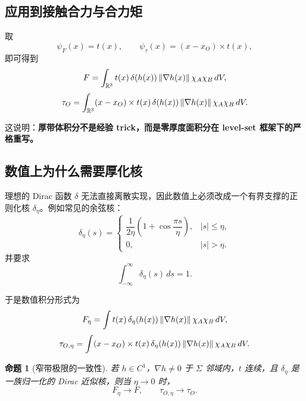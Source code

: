 \documentclass[12pt,a4paper]{ctexart}
\newtheorem{proposition}{命题}
\begin{document}
\subsection{应用到接触合力与合力矩}
取
\begin{equation}
    \psi_F(x)=t(x),
    \qquad
    \psi_\tau(x)=(x-x_O)\times t(x),
\end{equation}
即可得到
\begin{equation}
    F = \int_{\mathbb R^3} t(x)\,\delta(h(x))\,\norm{\nabla h(x)}\,\chi_A\chi_B\,dV,
\end{equation}
\begin{equation}
    \tau_O = \int_{\mathbb R^3}(x-x_O)\times t(x)\,\delta(h(x))\,\norm{\nabla h(x)}\,\chi_A\chi_B\,dV.
\end{equation}

这说明：\textbf{厚带体积分不是经验 trick，而是零厚度面积分在 level-set 框架下的严格重写。}

\subsection{数值上为什么需要厚化核}
理想的 Dirac 函数 $\delta$ 无法直接离散实现，因此数值上必须改成一个有界支撑的正则化核 $\delta_\eta$。例如常见的余弦核：
\begin{equation}
    \delta_\eta(s)=
    \begin{cases}
        \dfrac{1}{2\eta}\left(1+\cos\dfrac{\pi s}{\eta}\right), & |s|\le \eta,\\[2mm]
        0, & |s|>\eta.
    \end{cases}
\end{equation}
并要求
\begin{equation}
    \int_{-\infty}^{\infty}\delta_\eta(s)\,ds = 1.
\end{equation}

于是数值积分形式为
\begin{equation}
    F_\eta = \int t(x)\,\delta_\eta(h(x))\,\norm{\nabla h(x)}\,\chi_A\chi_B\,dV,
\end{equation}
\begin{equation}
    \tau_{O,\eta} = \int (x-x_O)\times t(x)\,\delta_\eta(h(x))\,\norm{\nabla h(x)}\,\chi_A\chi_B\,dV.
\end{equation}

\begin{proposition}[窄带极限的一致性]
若 $h\in C^1$，$\nabla h\neq 0$ 于 $\Sigma$ 邻域内，$t$ 连续，且 $\delta_\eta$ 是一族归一化的 Dirac 近似核，则当 $\eta\to 0$ 时，
\begin{equation}
    F_\eta \to F,
    \qquad
    \tau_{O,\eta}\to \tau_O.
\end{equation}
\end{proposition}
\end{document}
